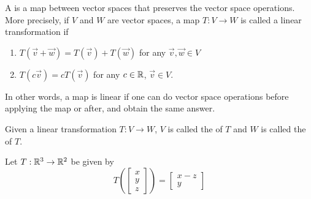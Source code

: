 


\begin{applicationActivities}{1}{17}

\begin{definition}
A  is a map between vector spaces that preserves the vector space operations.  More precisely, if $V$ and $W$ are vector spaces, a map $T:V\rightarrow W$ is called a linear transformation if
\begin{enumerate}
\item $T(\vec{v}+\vec{w}) = T(\vec{v})+T(\vec{w})$ for any $\vec{v},\vec{w} \in V$
\item $T(c\vec{v}) = cT(\vec{v})$ for any $c \in \mathbb{R}$, $\vec{v} \in V$.
\end{enumerate}
In other words, a map is linear if one can do vector space operations before applying the map or after, and obtain the same answer.
\end{definition}

\begin{definition}
Given a linear transformation \(T:V\to W\),
$V$ is called the  of $T$ and
$W$ is called the  of $T$.

\begin{center}
\end{center}
\end{definition}

\begin{example}
Let $T : \mathbb{R}^3 \rightarrow \mathbb{R}^2$ be given by $$T\left(\begin{bmatrix} x \\ y \\ z \end{bmatrix} \right) = \begin{bmatrix} x-z \\ y \end{bmatrix}$$


\end{example}
\end{applicationActivities}
